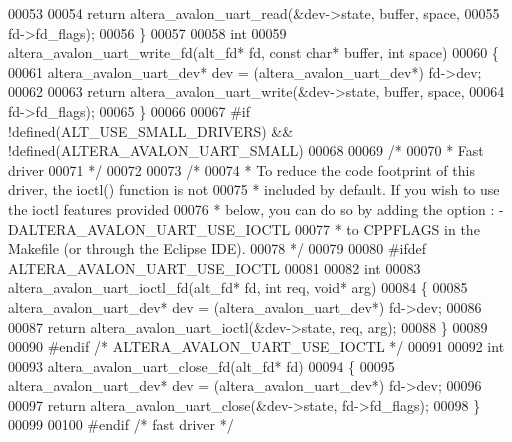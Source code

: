 \begin{DoxyCode}
00053 
00054     \textcolor{keywordflow}{return} altera_avalon_uart_read(&dev->state, buffer, space,
00055       fd->fd_flags);
00056 \}
00057 
00058 \textcolor{keywordtype}{int} 
00059 altera_avalon_uart_write_fd(alt_fd* fd, \textcolor{keyword}{const} \textcolor{keywordtype}{char}* buffer, \textcolor{keywordtype}{int} space)
00060 \{
00061     altera_avalon_uart_dev* dev = (altera_avalon_uart_dev*) fd->dev; 
00062 
00063     \textcolor{keywordflow}{return} altera_avalon_uart_write(&dev->state, buffer, space,
00064       fd->fd_flags);
00065 \}
00066 
00067 \textcolor{preprocessor}{#if !defined(ALT\_USE\_SMALL\_DRIVERS) && !defined(ALTERA\_AVALON\_UART\_SMALL)}
00068 
00069 \textcolor{comment}{/*}
00070 \textcolor{comment}{ * Fast driver}
00071 \textcolor{comment}{ */}
00072 
00073 \textcolor{comment}{/*}
00074 \textcolor{comment}{ * To reduce the code footprint of this driver, the ioctl() function is not}
00075 \textcolor{comment}{ * included by default. If you wish to use the ioctl features provided }
00076 \textcolor{comment}{ * below, you can do so by adding the option : -DALTERA\_AVALON\_UART\_USE\_IOCTL}
00077 \textcolor{comment}{ * to CPPFLAGS in the Makefile (or through the Eclipse IDE).}
00078 \textcolor{comment}{ */}
00079 
00080 \textcolor{preprocessor}{#ifdef ALTERA\_AVALON\_UART\_USE\_IOCTL}
00081 
00082 \textcolor{keywordtype}{int} 
00083 altera_avalon_uart_ioctl_fd(alt_fd* fd, \textcolor{keywordtype}{int} req, \textcolor{keywordtype}{void}* arg)
00084 \{
00085     altera_avalon_uart_dev* dev = (altera_avalon_uart_dev*) fd->dev;
00086 
00087     \textcolor{keywordflow}{return} altera_avalon_uart_ioctl(&dev->state, req, arg);
00088 \}
00089 
00090 \textcolor{preprocessor}{#endif }\textcolor{comment}{/* ALTERA\_AVALON\_UART\_USE\_IOCTL */}\textcolor{preprocessor}{}
00091 
00092 \textcolor{keywordtype}{int} 
00093 altera_avalon_uart_close_fd(alt_fd* fd)
00094 \{
00095     altera_avalon_uart_dev* dev = (altera_avalon_uart_dev*) fd->dev; 
00096 
00097     \textcolor{keywordflow}{return} altera_avalon_uart_close(&dev->state, fd->fd_flags);
00098 \}
00099 
00100 \textcolor{preprocessor}{#endif }\textcolor{comment}{/* fast driver */}\textcolor{preprocessor}{}
\end{DoxyCode}
